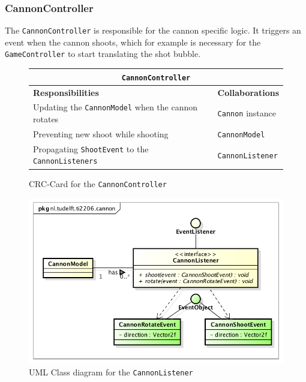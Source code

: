 \documentclass[a4paper]{article}
\begin{document}
\subsubsection*{CannonController}
The \texttt{CannonController} is responsible for the cannon specific logic. It triggers an event when the cannon shoots, which for example is necessary for the \texttt{GameController} to start translating the shot bubble.

\begin{figure}[H]
    \begin{center}
    \begin{tabular}{ | p{8cm} | p{4cm} | }
      \multicolumn{2}{c}{\texttt{CannonController}} \\ \hline
      \textbf{Responsibilities} & \textbf{Collaborations} \\ \hline
      Updating the \texttt{CannonModel} when the cannon rotates & \texttt{Cannon} instance \\
      Preventing new shoot while shooting & \texttt{CannonModel} \\
      Propagating \texttt{ShootEvent} to the \texttt{CannonListeners} & \texttt{CannonListener} \\
      \hline
    \end{tabular}
    \end{center}
    \caption{CRC-Card for the \texttt{CannonController}}
\end{figure}

\begin{figure}[H]
    \centering
    \includegraphics[scale=0.5]{CannonListener.png}
    \caption{UML Class diagram for the \texttt{CannonListener}}
\end{figure}
\end{document}
